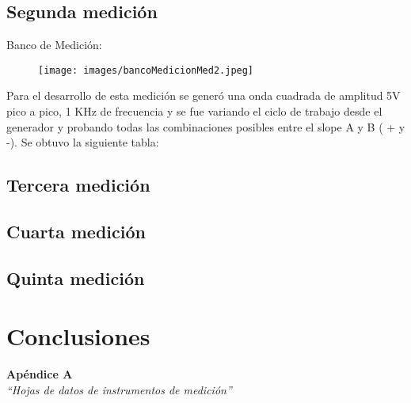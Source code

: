 \documentclass{article}
\begin{document}
\subsection{Segunda medición}

	Banco de Medición:
	
	\begin{figure}[h]
				\centering
				\texttt{[image: images/bancoMedicionMed2.jpeg]}
				\medskip
	\end{figure}
	\bigskip\bigskip
	
	Para el desarrollo de esta medición se generó una onda cuadrada de amplitud 5V pico a pico, 1 KHz de frecuencia y se fue variando el ciclo de trabajo desde el generador y probando todas las combinaciones posibles entre el slope A y B ( + y -). Se obtuvo la siguiente tabla:
	

\subsection{Tercera medición}


\subsection{Cuarta medición}


\subsection{Quinta medición}


\section{Conclusiones}

	
\bigskip\bigskip


\newpage \textit{}
\newpage



\newpage
\vspace*{4cm}
\begin{center}
	\textbf{\Huge{Apéndice A}} \\
	\bigskip\bigskip
	\Large{\textit{``Hojas de datos de instrumentos de medición''}}
\end{center}


\newpage \textit{}
\newpage
\end{document}
